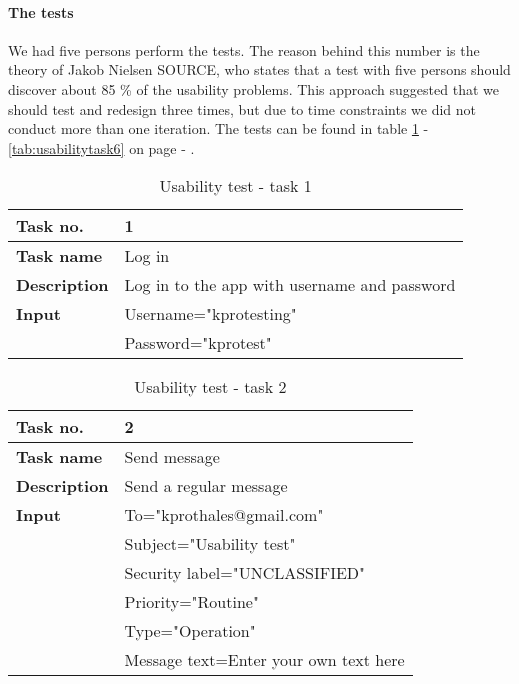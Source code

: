 		\paragraph{The tests}
			We had five persons perform the tests. The reason behind this number is the theory of Jakob Nielsen SOURCE, who states that a test with five persons should discover about 85 \% of the usability problems. This approach suggested that we should test and redesign three times, but due to time constraints we did not conduct more than one iteration.  
		\newline \newline
		The tests can be found in table \ref{tab:usabilitytask1} - \ref{tab:usabilitytask6} on page \pageref{tab:usabilitytask1} - \pageref{tab:usabilitytask6}.
		\begin{table}
			\begin{tabular}{>{\bfseries}l l}	
				Task no.&1\\ \hline
				Task name&Log in\\ \hline
				Description&Log in to the app with username and password\\ \hline
				Input&Username="kprotesting" \\
					&Password="kprotest"\\ \hline
			\end{tabular}
			\caption{Usability test - task 1} \label{tab:usabilitytask1}
		\end{table}
		\begin{table}
			\begin{tabular}{>{\bfseries}l l}	
				Task no.&2\\ \hline
				Task name&Send message\\ \hline
				Description&Send a regular message\\ \hline
				Input&To="kprothales@gmail.com" \\
					&Subject="Usability test"\\
					&Security label="UNCLASSIFIED"\\ 
					&Priority="Routine"\\
					&Type="Operation"\\
					&Message text=Enter your own text here\\ \hline
			\end{tabular}
			\caption{Usability test - task 2} \label{tab:usabilitytask2}
		\end{table}
